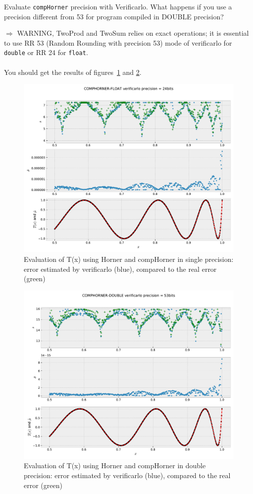 \documentclass{TP}
\begin{document}
\begin{question}
  Evaluate {\tt compHorner} precision with Verificarlo. What happens if you use a precision different from 53 for program compiled in DOUBLE precision?

  $\Rightarrow$ WARNING, {\sc TwoProd} and {\sc TwoSum} relies on exact operations; it is essential to use RR 53 (Random Rounding with precision 53) mode of verificarlo for  \texttt{double} or RR 24 for \texttt{float}.
  \\~\\
  You should get the results of figures~\ref{fig:comphornerVerificarlo24} and \ref{fig:comphornerVerificarlo53}.
\end{question}

\begin{figure}[h!]
\center \includegraphics[width=.8\textwidth]{COMPHORNER-FLOAT-24+err.pdf}
  \caption{Evaluation of T(x) using Horner and compHorner in single precision: error estimated by verificarlo (blue), compared to the real error (green) }
  \label{fig:comphornerVerificarlo24}
\end{figure}

\begin{figure}[h!]
\center \includegraphics[width=.8\textwidth]{COMPHORNER-DOUBLE-53+err.pdf}
  \caption{Evaluation of T(x) using Horner and compHorner in double precision: error estimated by verificarlo (blue), compared to the real error (green)}
  \label{fig:comphornerVerificarlo53}
\end{figure}
\end{document}
